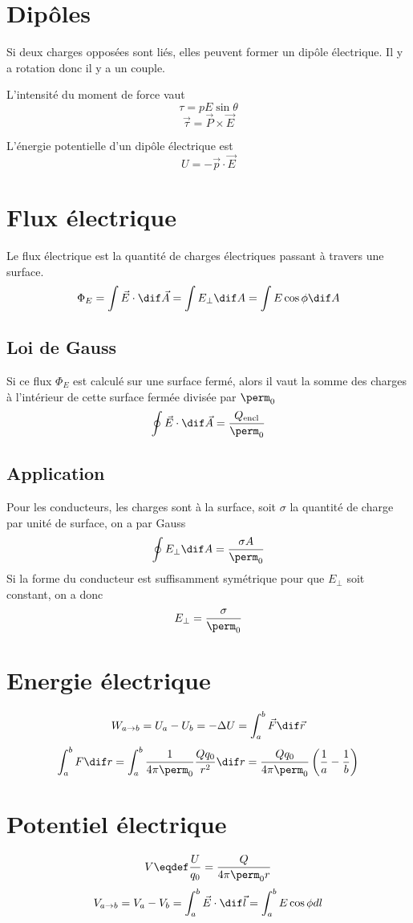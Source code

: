 \section{Dipôles}
Si deux charges opposées sont liés, elles peuvent former un dipôle électrique.
Il y a rotation donc il y a un couple.

L'intensité du moment de force vaut
\[ \tau = pE\sin{\theta} \]
\[ \vec{\tau} = \vec{P} \times \vec{E} \]

L'énergie potentielle d'un dipôle électrique est
\[ U = -\vec{p} \cdot \vec{E} \]

\section{Flux électrique}
Le flux électrique est la quantité de charges
électriques passant à travers une surface.
\[ \Phi_E = \int \vec{E} \cdot \dif\vec{A} =
\int E_{\perp} \dif A = \int E\cos\phi \dif A \]

\subsection{Loi de Gauss}
Si ce flux $\Phi_E$ est calculé sur une surface fermé,
alors il vaut la somme des charges à l'intérieur
de cette surface fermée divisée par $\perm_0$
\[ \oint \vec{E} \cdot \dif\vec{A} = \frac{Q_\mathrm{encl}}{\perm_0} \]

\subsection{Application}
Pour les conducteurs, les charges sont à la surface,
soit $\sigma$ la quantité de charge par unité de surface, on a par Gauss
\[ \oint E_\perp \dif A = \frac{\sigma A}{\perm_0} \]
Si la forme du conducteur est suffisamment symétrique
pour que $E_\perp$ soit constant, on a donc
\[ E_{\perp} = \frac{\sigma}{\perm_0} \]

\section{Energie électrique}
\[ W_{a\rightarrow b} = U_a - U_b = -\Delta{U}
= \int_{a}^{b}\vec{F} \dif \vec{r} \]
\[ \int_{a}^{b}F \dif r
= \int_{a}^{b}\frac{1}{4\pi\perm_0}\frac{Qq_0}{r^2} \dif r
= \frac{Qq_0}{4\pi\perm_0}\left(\frac{1}{a} - \frac{1}{b}\right) \]

\section{Potentiel électrique}
\[ V \eqdef \frac{U}{q_0} = \frac{Q}{4\pi\perm_0{r}} \]
\[ V_{a \rightarrow b} = V_a - V_b = \int_{a}^{b}\vec{E}\cdot\dif\vec{l}
= \int_{a}^{b}E\cos{\phi} dl \]

